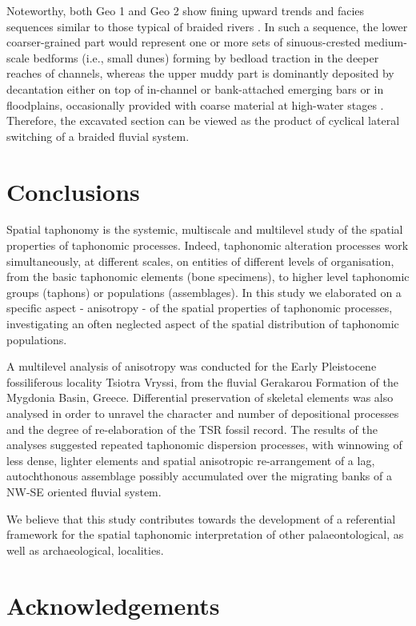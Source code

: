\documentclass[5p,times,authoryear]{elsarticle}
\begin{document}
Noteworthy, both Geo 1 and Geo 2 show fining upward trends and facies sequences similar to those typical of braided rivers \citep{Miall1977}. In such a sequence, the lower coarser-grained part would represent one or more sets of sinuous-crested medium-scale bedforms (i.e., small dunes) forming by bedload traction in the deeper reaches of channels, whereas the upper muddy part is dominantly deposited by decantation either on top of in-channel or bank-attached emerging bars or in floodplains, occasionally provided with coarse material at high-water stages \citep{Miall1982}. Therefore, the excavated section can be viewed as the product of cyclical lateral switching of a braided fluvial system.

\section{Conclusions}

Spatial taphonomy is the systemic, multiscale and multilevel study of the spatial properties of taphonomic processes. Indeed, taphonomic alteration processes work simultaneously, at different scales, on entities of different levels of organisation, from the basic taphonomic elements (bone specimens), to higher level taphonomic groups (taphons) or populations (assemblages). In this study we elaborated on a specific aspect - anisotropy - of the spatial properties of taphonomic processes, investigating an often neglected aspect of the spatial distribution of taphonomic populations.

A multilevel analysis of anisotropy was conducted for the Early Pleistocene fossiliferous locality Tsiotra Vryssi, from the fluvial Gerakarou Formation of the Mygdonia Basin, Greece. Differential preservation of skeletal elements was also analysed in order to unravel the character and number of depositional processes and the degree of re-elaboration of the TSR fossil record. The results of the analyses suggested repeated taphonomic dispersion processes, with winnowing of less dense, lighter elements and spatial anisotropic re-arrangement of a lag, autochthonous assemblage possibly accumulated over the migrating banks of a NW-SE oriented fluvial system.

We believe that this study contributes towards the development of a referential framework for the spatial taphonomic interpretation of other palaeontological, as well as archaeological, localities.

\section*{Acknowledgements}
\end{document}
